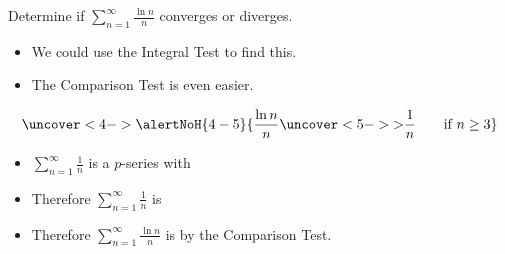 \begin{frame}
\begin{example}[Example 2, p. 742]
Determine if $\sum_{n=1}^\infty \frac{\ln n}{n}$ converges or diverges.
\begin{itemize}
\item<2->  We could use the Integral Test to find this.
\item<3->  The Comparison Test is even easier.
\end{itemize}
\abovedisplayskip=0pt
\belowdisplayskip=0pt
\[
\uncover<4->{%
\alertNoH{ 4-5}{%
\frac{\ln n}{n} \uncover<5->{ > } \frac{1}{n} \qquad \textrm{if} \ n \geq 3
}}%
\]
\begin{itemize}
\item<6->  $\sum_{n=1}^\infty \frac{1}{n}$ is a $p$-series with 
\item<8-| alert@8-9>  Therefore $\sum_{n=1}^\infty \frac{1}{n}$ is 
\item<10-| alert@10-11>  Therefore $\sum_{n=1}^\infty \frac{\ln n}{n}$ is  by the Comparison Test.
\end{itemize}
\end{example}
\end{frame}
